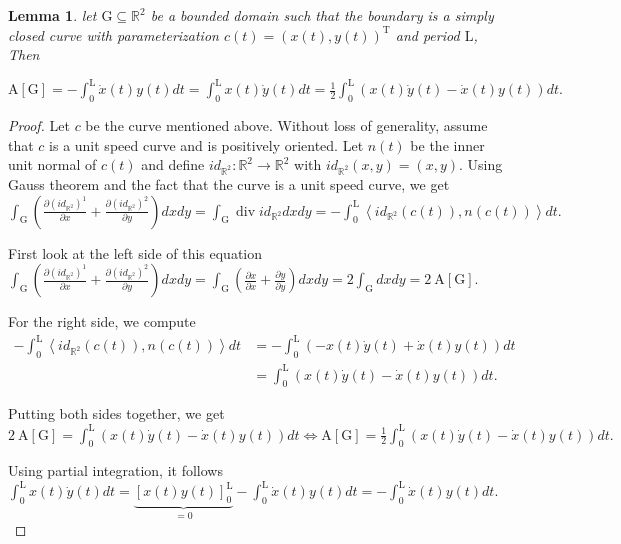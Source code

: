 \documentclass[a4paper]{book}
\newtheorem{lemma}[theorem]{Lemma}%
\numberwithin{theorem}{section}%
\begin{document}
\begin{lemma}
    let $\mathrm{G}\subseteq\mathbb{R}^{2}$ be a bounded domain such that the boundary is a simply closed curve with parameterization $c(t)=(x(t),y(t))^{\mathrm{T}}$ and period $\mathrm{L}$, Then
    \begin{center}
        $\mathrm{A}[\mathrm{G}]=-\int_0^{\mathrm{L}} \dot{x}(t) y(t) d t=\int_0^{\mathrm{L}} x(t) \dot{y}(t) d t=\frac{1}{2} \int_0^{\mathrm{L}}(x(t) \dot{y}(t)-\dot{x}(t) y(t)) d t .$
    \end{center}    
\end{lemma}
\begin{proof}
    Let $c$ be the curve mentioned above. Without loss of generality, assume that $c$ is a unit speed curve and is positively oriented. Let $n(t)$ be the inner unit normal of $c(t)$ and define $i d_{\mathbb{R}^2}: \mathbb{R}^2 \rightarrow \mathbb{R}^2$ with $i d_{\mathbb{R}^2}(x, y)=(x, y)$. Using Gauss theorem and the fact that the curve is a unit speed curve, we get
    $\int_{\mathrm{G}}\left(\frac{\partial\left(i d_{\mathbb{R}^2}\right)^1}{\partial x}+\frac{\partial\left(i d_{\mathbb{R}^2}\right)^2}{\partial y}\right) d x d y=\int_{\mathrm{G}} \operatorname{div} i d_{\mathbb{R}^2} d x d y=-\int_0^{\mathrm{L}}\left\langle i d_{\mathbb{R}^2}(c(t)), n(c(t))\right\rangle d t .$

    First look at the left side of this equation
    $\int_{\mathrm{G}}\left(\frac{\partial\left(i d_{\mathbb{R}^2}\right)^1}{\partial x}+\frac{\partial\left(i d_{\mathbb{R}^2}\right)^2}{\partial y}\right) d x d y=\int_{\mathrm{G}}\left(\frac{\partial x}{\partial x}+\frac{\partial y}{\partial y}\right) d x d y=2 \int_{\mathrm{G}} d x d y=2 \mathrm{~A}[\mathrm{G}] .$

    For the right side, we compute
    $\begin{aligned}
    -\int_0^{\mathrm{L}}\left\langle i d_{\mathbb{R}^2}(c(t)), n(c(t))\right\rangle d t & =-\int_0^{\mathrm{L}}(-x(t) \dot{y}(t)+\dot{x}(t) y(t)) d t \\
    & =\int_0^{\mathrm{L}}(x(t) \dot{y}(t)-\dot{x}(t) y(t)) d t .
    \end{aligned}$

    Putting both sides together, we get
    $2 \mathrm{~A}[\mathrm{G}]=\int_0^{\mathrm{L}}(x(t) \dot{y}(t)-\dot{x}(t) y(t)) d t \Leftrightarrow \mathrm{A}[\mathrm{G}]=\frac{1}{2} \int_0^{\mathrm{L}}(x(t) \dot{y}(t)-\dot{x}(t) y(t)) d t .$

    Using partial integration, it follows
    $\int_0^{\mathrm{L}} x(t) \dot{y}(t) d t=\underbrace{[x(t) y(t)]_0^{\mathrm{L}}}_{=0}-\int_0^{\mathrm{L}} \dot{x}(t) y(t) d t=-\int_0^{\mathrm{L}} \dot{x}(t) y(t) d t .$
\end{proof}
\end{document}
